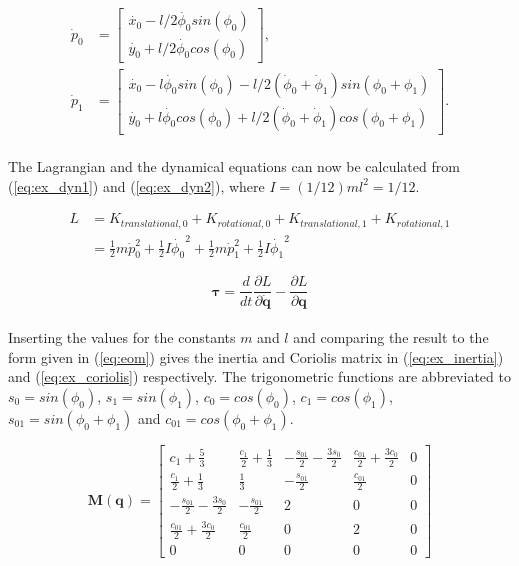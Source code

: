 \begin{equation}
    \begin{split}
        \dot{p}_0 &=
        \begin{bmatrix}
            \dot{x_0} - l/2 \dot{\phi_0} sin(\phi_0)\\
            \dot{y_0} + l/2 \dot{\phi_0} cos(\phi_0)
        \end{bmatrix}, \\
        \dot{p}_1 &=
        \begin{bmatrix}
            \dot{x_0} - l \dot{\phi_0} sin(\phi_0) - l/2 (\dot{\phi}_0 +\dot{\phi}_1) sin(\phi_0+\phi_1)\\
            \dot{y_0} + l \dot{\phi_0} cos(\phi_0) + l/2 (\dot{\phi}_0 +\dot{\phi}_1) cos(\phi_0+\phi_1)
        \end{bmatrix}.
    \end{split}
\end{equation}
\\
The Lagrangian and the dynamical equations can now be calculated from (\ref{eq:ex_dyn1}) and (\ref{eq:ex_dyn2}), where $I = (1/12)ml^2 = 1/12$.

\begin{equation}\label{eq:ex_dyn1}
    \begin{split}
        L &= K_{translational,0} + K_{rotational,0} + K_{translational,1} + K_{rotational,1}\\
        &= \frac{1}{2} m \dot{p}_0^2 + \frac{1}{2}I\dot{\phi_0}^2 + \frac{1}{2} m \dot{p}_1^2 + \frac{1}{2}I\dot{\phi_1}^2
    \end{split}
\end{equation}

\begin{equation}\label{eq:ex_dyn2}
    \boldsymbol{\tau} = \frac{d}{dt} \frac{\partial L}{\partial \dot{\mathbf{q}}} - \frac{\partial L}{\partial \mathbf{q}}
\end{equation}
\\
Inserting the values for the constants $m$ and $l$ and comparing the result to the form given in (\ref{eq:eom}) gives the inertia and Coriolis matrix in (\ref{eq:ex_inertia}) and (\ref{eq:ex_coriolis}) respectively. The trigonometric functions are abbreviated to $s_0 = sin(\phi_0)$, $s_1 = sin(\phi_1)$, $c_0 = cos(\phi_0)$, $c_1 = cos(\phi_1)$, $s_{01} = sin(\phi_0+\phi_1)$ and $c_{01} = cos(\phi_0+\phi_1)$.

\begin{equation}\label{eq:ex_inertia}
    \mathbf{M(q)} = 
    \begin{bmatrix}
        c_1+\frac{5}{3} & \frac{c_1}{2} + \frac{1}{3} & -\frac{s_{01}}{2} - \frac{3s_0}{2} & \frac{c_{01}}{2} + \frac{3c_0}{2} & 0 \\
        \frac{c_1}{2}+\frac{1}{3} & \frac{1}{3} & -\frac{s_{01}}{2} & \frac{c_{01}}{2} & 0 \\
        -\frac{s_{01}}{2}- \frac{3s_0}{2} & -\frac{s_{01}}{2} & 2 & 0 & 0 \\
        \frac{c_{01}}{2}+ \frac{3c_0}{2} & \frac{c_{01}}{2} & 0 & 2 & 0 \\
        0 & 0 & 0 & 0 & 0 
    \end{bmatrix}
\end{equation}

